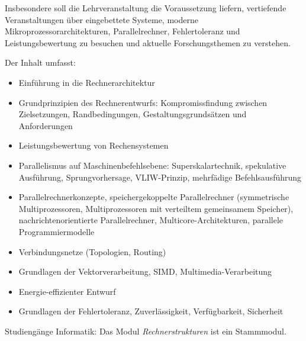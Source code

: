 \begin{module}
\begin{learningoutcomes}
Insbesondere soll die Lehrveranstaltung die Voraussetzung liefern, vertiefende Veranstaltungen über eingebettete Systeme, moderne Mikroprozessorarchitekturen, Parallelrechner, Fehlertoleranz und Leistungsbewertung zu besuchen und aktuelle Forschungsthemen zu verstehen.


\end{learningoutcomes}

\begin{content}
Der Inhalt umfasst:

 \begin{itemize}\item Einführung in die Rechnerarchitektur  \item Grundprinzipien des Rechnerentwurfs: Kompromissfindung zwischen Zielsetzungen, Randbedingungen, Gestaltungsgrundsätzen und Anforderungen  \item Leistungsbewertung von Rechensystemen  \item Parallelismus auf Maschinenbefehlsebene: Superskalartechnik, spekulative Ausführung, Sprungvorhersage, VLIW-Prinzip, mehrfädige Befehlsausführung  \item Parallelrechnerkonzepte, speichergekoppelte Parallelrechner (symmetrische Multiprozessoren, Multiprozessoren mit verteiltem gemeinsamem Speicher), nachrichtenorientierte Parallelrechner, Multicore-Architekturen, parallele Programmiermodelle  \item Verbindungsnetze (Topologien, Routing)  \item Grundlagen der Vektorverarbeitung, SIMD, Multimedia-Verarbeitung  \item Energie-effizienter Entwurf  \item Grundlagen der Fehlertoleranz, Zuverlässigkeit, Verfügbarkeit, Sicherheit  \end{itemize}
\end{content}

\begin{remarks}Studiengänge Informatik: Das Modul \emph{Rechnerstrukturen} ist ein Stammmodul.

\end{remarks}

\end{module}


